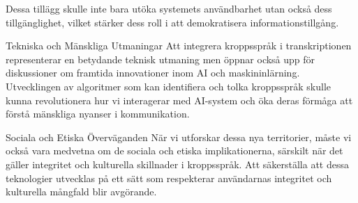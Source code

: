 Dessa tillägg skulle inte bara utöka systemets användbarhet utan också dess tillgänglighet, vilket stärker dess roll i att demokratisera informationstillgång.

Tekniska och Mänskliga Utmaningar
Att integrera kroppsspråk i transkriptionen representerar en betydande teknisk utmaning men öppnar också upp för diskussioner om framtida innovationer inom AI och maskininlärning. Utvecklingen av algoritmer som kan identifiera och tolka kroppsspråk skulle kunna revolutionera hur vi interagerar med AI-system och öka deras förmåga att förstå mänskliga nyanser i kommunikation.

Sociala och Etiska Överväganden
När vi utforskar dessa nya territorier, måste vi också vara medvetna om de sociala och etiska implikationerna, särskilt när det gäller integritet och kulturella skillnader i kroppsspråk. Att säkerställa att dessa teknologier utvecklas på ett sätt som respekterar användarnas integritet och kulturella mångfald blir avgörande.